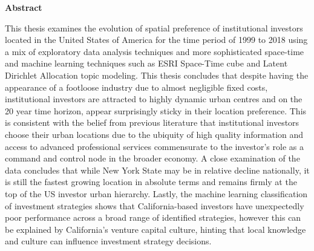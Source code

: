 \documentclass[12pt,letterpaper]{book}
\makeatletter
\numberwithin{figure}{chapter}
\newenvironment{preliminary}%
{\pagestyle{plain}\pagenumbering{roman}}%
{\pagenumbering{arabic}}
\newcommand\isdefinedspinetitle[1]{%
	\edef\@tempa{#1}%
	\def\@tempb{}%
	\ifx\@tempa\@tempb
	\else (Spine title: #1)\\
	\fi
}
\newcommand\coauthor[1]{%
	\edef\@tempa{#1}%
	\def\@tempb{}%
	\ifx\@tempa\@tempb
	\else \newpage \Large Co-Authorship Statement\normalsize\\\indent\\#1\\
	\fi
}
\newcommand\acknowlege[1]{%
	\edef\@tempa{#1}%
	\def\@tempb{}%
	\ifx\@tempa\@tempb
	\else \newpage \Large Acknowlegements\normalsize\\\indent\\#1\newpage
	\fi
}
\newcommand{\department}{Geography}
\newcommand{\degree}{Doctor of Philosophy}
\newcommand{\firstname}{Martin}
\newcommand{\middlename}{Raymond}
\newcommand{\lastname}{Lefebvre}
\newcommand{\authorname}{{\firstname} {\middlename} {\lastname}}
\newcommand{\titl}{Examination of Institutional Investment in the United States of America from 1999 to 2018}
\newcommand{\thesisformat}{Monograph} %
\newcommand{\gyear}{\number\year}
\newcommand{\makecoauthor}{
	
}
\newcommand{\makeacknowlege} {
	\Large\begin{center}\textbf{Acknowlegement}\end{center}\normalsize
	
	\begin{spacing}{2}
		I would like to express my very great appreciation to Dr Milford B. Green for his valuable and constructive suggestions during the planning and development of this research work. His willingness to give his time so generously over this project and my previous works has been very much appreciated. \newline
		
		I would like to acknowledge the support and encouragement provided by my family during the preparation of this project. Without their help, editing the document would have been an unbearable task and the finished product would have been less clear and concise.     
		
		I would like to acknowledge the support of the Geography department of the University of Western Ontario for their continued support and stimulating intellectual environment.    
	\end{spacing}  
}
\renewcommand{\maketitle}
{\begin{titlepage}
		\setcounter{page}{1}
		\begin{spacing}{1} 
			\begin{large}
				\begin{center}
					\mbox{}
					\vfill
					{\MakeUppercase{\titl}}\\
					(Thesis format: \thesisformat)\\
					\vfill
					by \\
					\vfill
					{\firstname} \underline{\lastname}\\
					\vfill
					Graduate Program in {\department}\\
					\vfill
					A thesis submitted in partial fulfillment\\
					of the requirements for the degree of\\
					\degree\\
					\vfill
					The School of Graduate and Postdoctoral Studies\\
					The University of Western Ontario\\
					London, Ontario, Canada\\
					\vfill
					{\copyright} {\authorname} {\gyear}  \\
					\vspace*{.2in}
				\end{center}
			\end{large}
		\end{spacing}
	\end{titlepage}
	
}%
\makeatother
\begin{document}
	
	
	
	\begin{preliminary}
		
		
		\Large\begin{center}\textbf{Abstract}\end{center}\normalsize
		\begin{spacing}{2}
			\setcounter{page}{2}
			
			
			
			This thesis examines the evolution of spatial preference of institutional investors located in the United States of America for the time period of 1999 to 2018 using a mix of exploratory data analysis techniques and more sophisticated space-time and machine learning techniques such as ESRI Space-Time cube and Latent Dirichlet Allocation topic modeling.  This thesis concludes that despite having the appearance of a footloose industry due to almost negligible fixed costs, institutional investors are attracted to highly dynamic urban centres and on the 20 year time horizon, appear surprisingly sticky in their location preference. This is consistent with the belief from previous literature that institutional investors choose their urban locations due to the ubiquity of high quality information and access to advanced professional services commensurate to the investor's role as a command and control node in the broader economy. A close examination of the data concludes that while New York State may be in relative decline nationally, it is still the fastest growing location in absolute terms and remains firmly at the top of the US investor urban hierarchy.  Lastly, the machine learning classification of investment strategies shows that California-based investors have unexpectedly poor performance across a broad range of identified strategies, however this can be explained by California's venture capital culture, hinting that local knowledge and culture can influence investment strategy decisions.
			

\end{spacing}
\end{preliminary}
\end{document}
